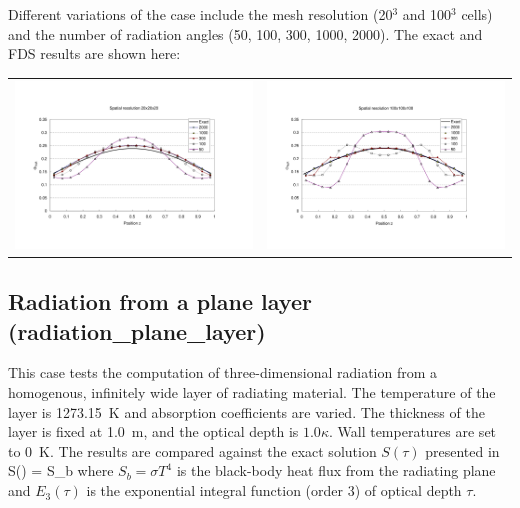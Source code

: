 \documentclass[11pt]{book}
\begin{document}
\noindent
Different variations of the case include the mesh resolution (20$^3$ and 100$^3$ cells)
and the number of radiation angles (50, 100, 300, 1000, 2000).
The exact and FDS results are shown here:

\begin{tabular*}{\textwidth}{lr}
\includegraphics[width=3.2in]{FIGURES/box_results_20} &
\includegraphics[width=3.2in]{FIGURES/box_results_100}
\end{tabular*}





\clearpage

\subsection{Radiation from a plane layer ({\bf radiation\_plane\_layer}) }

This case tests the computation of three-dimensional
radiation from a homogenous, infinitely wide layer of radiating
material.  The temperature of the layer is 1273.15~K and absorption
coefficients are varied. The thickness of the layer is fixed at 1.0~m,
and the optical depth is $1.0 \kappa$. Wall temperatures are set to 0~K.
The results are compared against the exact solution $S(\tau)$ presented
in~\cite{Zeldovich:1}
\be
S(\tau) = S_b
\ee
where $S_b = \sigma T^4$ is the black-body heat flux from
the radiating plane and $E_3(\tau)$ is the exponential
integral function (order 3) of optical depth $\tau$.
\end{document}
